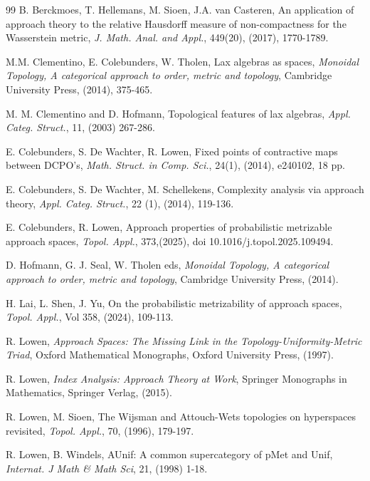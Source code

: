 \documentclass[12pt,a4paper]{amsart}
\theoremstyle{theorem}
\theoremstyle{definition}
\begin{document}
{\begin{thebibliography}{99}
 B. Berckmoes, T. Hellemans, M. Sioen, J.A. van Casteren, An application of approach theory to the relative Hausdorff measure of non-compactness for the Wasserstein metric, \emph{J. Math. Anal. and Appl.}, 449(20), (2017), 1770-1789.


 M.M. Clementino, E. Colebunders, W. Tholen, Lax algebras as spaces, \emph{Monoidal Topology, A \mbox{categorical} approach to order, metric and topology}, Cambridge University Press, (2014), 375-465.

 M. M. Clementino and D. Hofmann, Topological features of lax algebras, \emph{Appl. Categ. Struct.}, 11, (2003) 267-286.





   E. Colebunders, S. De Wachter, R. Lowen, Fixed points of contractive maps between DCPO's,
{\it Math. Struct. in Comp. Sci.}, 24(1), (2014), e240102, 18 pp.

 E. Colebunders, S. De Wachter, M. Schellekens, Complexity analysis via approach theory, \emph{Appl. Categ. Struct.}, 22 (1), (2014), 119-136.

 E. Colebunders, R. Lowen, Approach properties of probabilistic metrizable approach spaces, \emph{Topol. Appl.}, 373,(2025), doi 10.1016/j.topol.2025.109494.




  D. Hofmann, G. J. Seal, W. Tholen eds, \emph{Monoidal Topology, A \mbox{categorical} approach to order, metric and topology}, Cambridge University Press, (2014).
 
 
 
 H. Lai, L. Shen, J. Yu, On the probabilistic metrizability of approach spaces, \emph{Topol. Appl.}, Vol 358, (2024), 109-113.
 
  R.  Lowen, \textit{Approach Spaces: The Missing Link
in the Topology-Uniformity-Metric Triad}, Oxford Mathematical Monographs, Oxford University Press, (1997).

  R. Lowen, \emph{Index Analysis: Approach Theory at Work}, Springer Monographs in Mathematics, Springer Verlag, (2015).

 R. Lowen, M. Sioen, The Wijsman and Attouch-Wets topologies on hyperspaces revisited, \emph{Topol. Appl.}, 70, (1996), 179-197.

 R. Lowen, B. Windels, AUnif: A common supercategory of pMet and Unif, \emph{Internat. J Math \& Math Sci}, 21, (1998) 1-18.


\end{thebibliography}}
\end{document}
